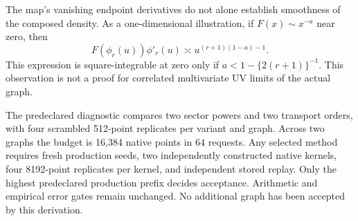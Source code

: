 \documentclass[11pt]{article}
\begin{document}
The map's vanishing endpoint derivatives do not alone establish
smoothness of the composed density. As a one-dimensional illustration,
if $F(x)\sim x^{-a}$ near zero, then
\[
 F(\phi_r(u))\phi'_r(u)
 \asymp u^{(r+1)(1-a)-1}.
\]
This expression is square-integrable at zero only if
$a<1-\{2(r+1)\}^{-1}$. This observation is not a proof for correlated
multivariate UV limits of the actual graph.

The predeclared diagnostic compares two sector powers and two transport
orders, with four scrambled 512-point replicates per variant and graph.
Across two graphs the budget is 16,384 native points in 64 requests.
Any selected method requires fresh production seeds, two independently
constructed native kernels, four 8192-point replicates per kernel, and
independent stored replay. Only the highest predeclared production
prefix decides acceptance. Arithmetic and empirical error gates remain
unchanged. No additional graph has been accepted by this derivation.
\end{document}
